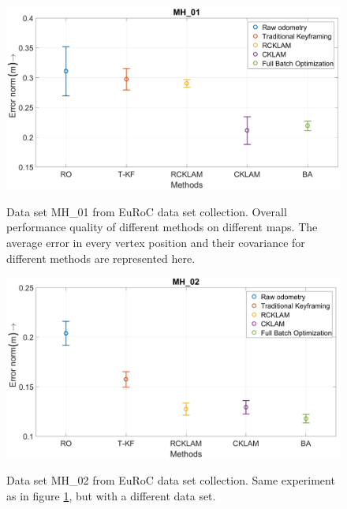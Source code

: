 \begin{figure}
	\centering
		\includegraphics[width=1.00\textwidth]{images/MethodComparisonMH01.png}
	\label{fig:MethodComparisonMH01}
  \caption{Data set MH\_01 from EuRoC \cite{Burri25012016} data set collection. Overall performance quality of different methods on different maps. The average error in every vertex position and their covariance for different methods are represented here.}
\end{figure}

\begin{figure}
	\centering
		\includegraphics[width=1.00\textwidth]{images/MethodComparisonMH02.png}
	\label{fig:MethodComparisonMH02}
  \caption{Data set MH\_02 from EuRoC \cite{Burri25012016} data set collection. Same experiment as in figure \ref{fig:MethodComparisonMH01}, but with a different data set.}
\end{figure}

